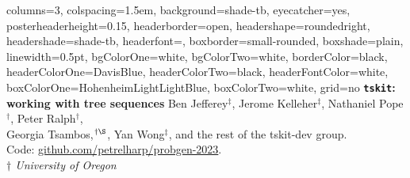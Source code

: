 \documentclass[fontscale=0.38,a0paper]{baposter}
\newcommand{\tskit}{{\texttt{tskit}}}
\begin{document}
\newlength{\leftimgwidth}
\begin{poster}%
  {
  columns=3,
  colspacing=1.5em,
  background=shade-tb,
  eyecatcher=yes,
  posterheaderheight=0.15\textheight,
  headerborder=open,
  headershape=roundedright,
  headershade=shade-tb,
  headerfont=\Large\textsf, %
  boxborder=small-rounded,
  boxshade=plain,
  linewidth=0.5pt,
  bgColorOne=white,
  bgColorTwo=white,
  borderColor=black,
  headerColorOne=DavisBlue,
  headerColorTwo=black,
  headerFontColor=white,
  boxColorOne=HohenheimLightLightBlue,
  boxColorTwo=white,
  grid=no
  }
  {
  }
  {\sf %
  \vspace{0.5em}
     \textbf{\textcolor{DavisBlue}{\tskit{}: working with tree sequences}}\vspace{0.5em}}
  {\sf %
    Ben Jefferey${}^\ddagger$,
    Jerome Kelleher$^{\ddagger}$,
    Nathaniel Pope${}^\dagger$,
    Peter Ralph${}^\dagger$,
    \\  \vspace{-1.0mm}
    Georgia Tsambos,${}^{\dagger\S}$,
    Yan Wong$^{\ddagger}$,
    and the rest of the tskit-dev group.
    \\  \vspace{-1.0mm}
    Code: \url{github.com/petrelharp/probgen-2023}. 
    \\  \vspace{-1.0mm}
    {\small \textit{$\dagger$ University of Oregon} } %
}
\end{poster}
\end{document}
